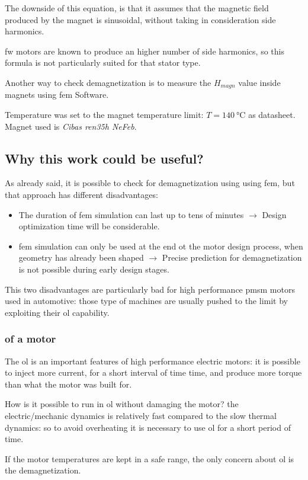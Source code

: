 The downside of this equation, is that it assumes that the magnetic field produced by the magnet is sinusoidal, without taking in consideration side harmonics. 

\gls{fw} motors are known to produce an higher number of side harmonics, so this formula is not particularly suited for that stator type.

Another way to check demagnetization is to measure the $H_{magn}$ value inside magnets using \gls{fem} Software.

Temperature was set to the magnet temperature limit: $T=\SI{140}{\celsius}$ as datasheet. Magnet used is \emph{Cibas ren35h NeFeb}.
\subsection{Why this work could be useful?}
As already said, it is possible to check for demagnetization using using \gls{fem}, but that approach has different disadvantages:
\begin{itemize}
    \item The duration of \gls{fem} simulation can last up to tens of minutes $\rightarrow$ Design optimization time will be considerable.
    \item \gls{fem} simulation can only be used at the end ot the motor design process, when geometry has already been shaped $\rightarrow$ Precise prediction for demagnetization is not possible during early design stages.
\end{itemize}

This two disadvantages are particularly bad for high performance \gls{pmsm} motors used in automotive: those type of machines are usually pushed to the limit by exploiting their \gls{ol} capability.
\subsubsection{\texorpdfstring{}{Overload} of a motor}
The \gls{ol} is an important features of high performance electric motors: it is possible to inject more current, for a short interval of time time, and produce more torque than what the motor was built for.

How is it possible to run in \gls{ol} without damaging the motor? the electric/mechanic dynamics is relatively fast compared to the slow thermal dynamics: so to avoid overheating it is necessary to use \gls{ol} for a short period of time.

If the motor temperatures are kept in a safe range, the only concern about \gls{ol} is the demagnetization.
